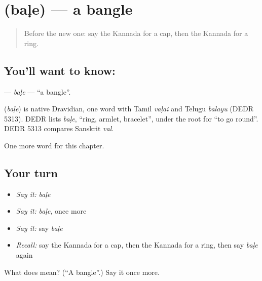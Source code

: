 \section[\texorpdfstring{\kn{ಬಳೆ} (baḷe)}{ಬಳೆ (baḷe)}]{ (baḷe) — a bangle}

\label{lesson:KA-C121-bale}



\begin{quote}
Before the new one: say the Kannada for a cap, then the Kannada for a ring.
\end{quote}

\subsection*{You'll want to know: }
\textbf{} — \emph{baḷe} — \textquotedblleft{}a bangle\textquotedblright{}.

\begin{cousinweb}
\textbf{} (\emph{baḷe}) is native Dravidian, one word with Tamil \emph{vaḷai} and Telugu \emph{balayu} (DEDR 5313). DEDR lists \emph{baḷe}, \textquotedblleft{}ring, armlet, bracelet\textquotedblright{}, under the root for \textquotedblleft{}to go round\textquotedblright{}. DEDR 5313 compares Sanskrit \emph{val}.
\end{cousinweb}

\begin{grammarlens}[title={What you've built}]
One more word for this chapter.
\end{grammarlens}

\subsection*{Your turn}
\begin{itemize}
\raggedright
  \item \emph{Say it:} \emph{baḷe}
  \item \emph{Say it:} \emph{baḷe}, once more
  \item \emph{Say it:} say \emph{baḷe}
  \item \emph{Recall:} say the Kannada for a cap, then the Kannada for a ring, then say \emph{baḷe} again
\end{itemize}

\begin{tcolorbox}[breakable,colback=teal!4,colframe=teal!35!black,title={Before you move on}]
What does  mean? (\textquotedblleft{}A bangle\textquotedblright{}.) Say it once more.
\end{tcolorbox}
